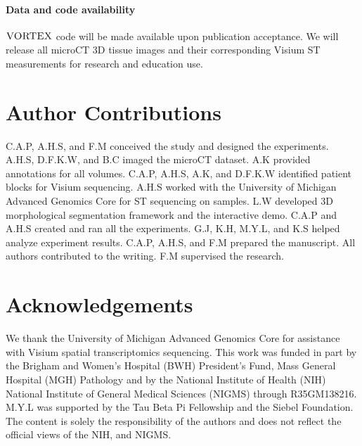\paragraph{Data and code availability} 

$\textsc{VORTEX}$ code will be made available upon publication acceptance. We will release all microCT 3D tissue images and their corresponding Visium ST measurements for research and education use. 


\section*{Author Contributions}
C.A.P, A.H.S, and F.M conceived the study and designed the experiments. A.H.S, D.F.K.W, and B.C imaged the microCT dataset. A.K provided annotations for all volumes. C.A.P, A.H.S, A.K, and D.F.K.W identified patient blocks for Visium sequencing. A.H.S worked with the University of Michigan Advanced Genomics Core for ST sequencing on samples. L.W developed 3D morphological segmentation framework and the interactive demo. C.A.P and A.H.S created and ran all the experiments. G.J, K.H, M.Y.L, and K.S helped analyze experiment results. C.A.P, A.H.S, and F.M prepared the manuscript. All authors contributed to the writing. F.M supervised the research.

\section*{Acknowledgements}
We thank the University of Michigan Advanced Genomics Core for assistance with Visium spatial transcriptomics sequencing.
This work was funded in part by the Brigham and Women’s Hospital (BWH) President’s Fund, Mass General Hospital (MGH) Pathology and by the National Institute of Health (NIH) National Institute of General Medical Sciences (NIGMS) through R35GM138216. M.Y.L was supported by the Tau Beta Pi Fellowship and the Siebel Foundation. The content is solely the responsibility of the authors and does not reflect the official views of the NIH, and NIGMS.


